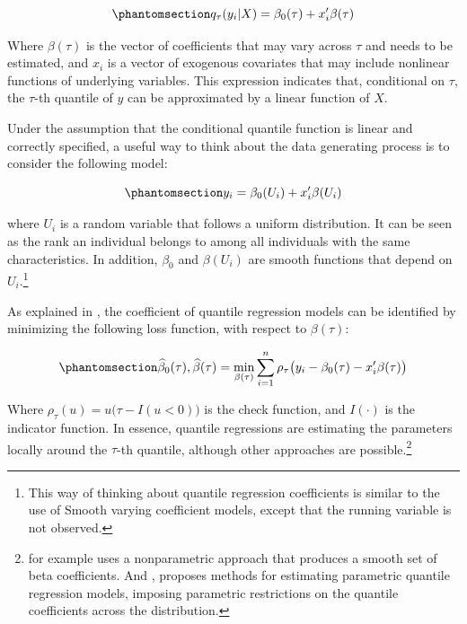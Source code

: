 \documentclass[bib]{statapress}
\begin{document}
\begin{equation}\phantomsection\label{eq-qr}{q_\tau(y_i|X)=\beta_0(\tau) + x_i'\beta(\tau)
}\end{equation}

Where \(\beta(\tau)\) is the vector of coefficients that may vary across
\(\tau\) and needs to be estimated, and \(x_i\) is a vector of exogenous
covariates that may include nonlinear functions of underlying variables.
This expression indicates that, conditional on \(\tau\), the \(\tau\)-th
quantile of \(y\) can be approximated by a linear function of \(X\).

Under the assumption that the conditional quantile function is linear
and correctly specified, a useful way to think about the data generating
process is to consider the following model:

\begin{equation}\phantomsection\label{eq-dgp}{y_i = \beta_0(U_i)+x_i'\beta(U_i) 
}\end{equation}

where \(U_i\) is a random variable that follows a uniform distribution.
It can be seen as the rank an individual belongs to among all
individuals with the same characteristics. In addition, \(\beta_0\) and
\(\beta(U_i)\) are smooth functions that depend on \(U_i\).\footnote{This
  way of thinking about quantile regression coefficients is similar to
  the use of Smooth varying coefficient models, except that the running
  variable is not observed.}

As explained in \citet{wooldridge2010}, the coefficient of quantile
regression models can be identified by minimizing the following loss
function, with respect to \(\beta(\tau)\):

\begin{equation}\phantomsection\label{eq-qloss}{
\hat\beta_0(\tau),\hat\beta(\tau) = \min_{\beta(\tau)} \sum_{i=1}^{n} \rho_\tau \big(y_i-\beta_0(\tau)-x_i'\beta(\tau)\big)
}\end{equation}

Where \(\rho_\tau(u)=u\big(\tau-I(u<0)\big)\) is the check function, and
\(I(\cdot)\) is the indicator function. In essence, quantile regressions
are estimating the parameters locally around the \(\tau\)-th quantile,
although other approaches are possible.\footnote{\citet{kaplan2017} for
  example uses a nonparametric approach that produces a smooth set of
  beta coefficients. And \citet{bottai2019}, proposes methods for
  estimating parametric quantile regression models, imposing parametric
  restrictions on the quantile coefficients across the distribution.}
\end{document}

